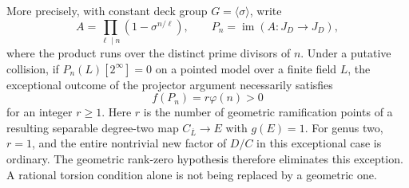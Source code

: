 \documentclass[11pt,a4paper]{article}
\begin{document}
More precisely, with constant deck group $G=\langle\sigma\rangle$,
write
\[
 A=\prod_{\ell\mid n}(1-\sigma^{n/\ell}),\qquad
 P_n=\operatorname{im}(A:J_D\longrightarrow J_D),
 \tag{GP.1}
\]
where the product runs over the distinct prime divisors of $n$.
Under a putative collision, if $P_n(L)[2^\infty]=0$ on a pointed
model over a finite field $L$, the exceptional outcome of the
projector argument necessarily satisfies
\[
                         f(P_n)=r\varphi(n)>0
 \tag{GP.2}
\]
for an integer $r\ge1$.  Here $r$ is the number of geometric
ramification points of a resulting separable degree-two map
$C_{\overline L}\to E$ with $g(E)=1$.
For genus two, $r=1$, and the entire nontrivial new factor of
$D/C$ in this exceptional case is ordinary.
The geometric rank-zero hypothesis therefore eliminates this
exception.  A rational torsion condition alone is not being
replaced by a geometric one.
\end{document}
